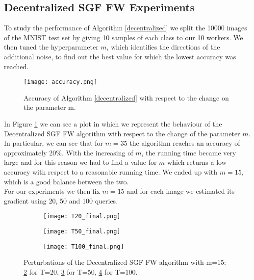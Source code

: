 \subsection{Decentralized SGF FW Experiments}
To study the performance of Algorithm \ref{decentralized} we split the 10000 images of the MNIST test set by giving 10 samples of each class to our 10 workers.
We then tuned the hyperparameter $m$, which identifies the directions of the additional noise, to find out the best value for which the lowest accuracy was reached.
\begin{figure}[htbp]
	\centering
	\texttt{[image: accuracy.png]}
	\caption{{\small Accuracy of Algorithm \ref{decentralized} with respect to the change on the parameter m.}}
	\label{fig:accuracy}
\end{figure}
In Figure \ref{fig:accuracy} we can see a plot in which we represent the behaviour of the Decentralized SGF FW algorithm  with respect to the change of the parameter $m$. In particular, we can see that for $m=35$ the algorithm reaches an accuracy of approximately 20\%. With the increasing of $m$, the running time became very large and for this reason we had to find a value for $m$ which returns a low accuracy with respect to a reasonable running time. We ended up with $m=15$, which is a good balance between the two.\\
For our experiments we then fix $m=15$ and for each image we estimated its gradient using 20, 50 and 100 queries.

\begin{figure}[h]
	\centering
	\begin{subfigure}[b]{0.15\textwidth}
		\centering
		\texttt{[image: T20\_final.png]}
		\caption{}
		\label{fig:decentralized_perturbation_20}
	\end{subfigure}
	\hfill
	\begin{subfigure}[b]{0.15\textwidth}
		\texttt{[image: T50\_final.png]}
		\caption{}
		\label{fig:decentralized_perturbation_50}
	\end{subfigure}
	\hfill
	\begin{subfigure}[b]{0.15\textwidth}
		\texttt{[image: T100\_final.png]}
		\caption{}
		\label{fig:decentralized_perturbation_100}
	\end{subfigure}
	\caption{{\small Perturbations of the Decentralized SGF FW algorithm with m=15: \ref{fig:decentralized_perturbation_20} for T=20, \ref{fig:decentralized_perturbation_50} for T=50,  \ref{fig:decentralized_perturbation_100} for T=100.}}
	\label{fig:decentralized_perturbations}
\end{figure}

